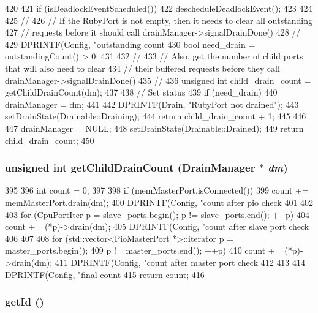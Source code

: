 \begin{DoxyCode}
420 {
421     if (isDeadlockEventScheduled()) {
422         descheduleDeadlockEvent();
423     }
424 
425     //
426     // If the RubyPort is not empty, then it needs to clear all outstanding
427     // requests before it should call drainManager->signalDrainDone()
428     //
429     DPRINTF(Config, "outstanding count %
430     bool need_drain = outstandingCount() > 0;
431 
432     //
433     // Also, get the number of child ports that will also need to clear
434     // their buffered requests before they call drainManager->signalDrainDone()
435     //
436     unsigned int child_drain_count = getChildDrainCount(dm);
437 
438     // Set status
439     if (need_drain) {
440         drainManager = dm;
441 
442         DPRINTF(Drain, "RubyPort not drained\n");
443         setDrainState(Drainable::Draining);
444         return child_drain_count + 1;
445     }
446 
447     drainManager = NULL;
448     setDrainState(Drainable::Drained);
449     return child_drain_count;
450 }
\end{DoxyCode}
\hypertarget{classRubyPort_a6497fe5e5b0476effb15db9118962e93}{
\subsubsection[{getChildDrainCount}]{\setlength{\rightskip}{0pt plus 5cm}unsigned int getChildDrainCount ({\bf DrainManager} $\ast$ {\em dm})}}
\label{classRubyPort_a6497fe5e5b0476effb15db9118962e93}



\begin{DoxyCode}
395 {
396     int count = 0;
397 
398     if (memMasterPort.isConnected()) {
399         count += memMasterPort.drain(dm);
400         DPRINTF(Config, "count after pio check %
401     }
402 
403     for (CpuPortIter p = slave_ports.begin(); p != slave_ports.end(); ++p) {
404         count += (*p)->drain(dm);
405         DPRINTF(Config, "count after slave port check %
406     }
407 
408     for (std::vector<PioMasterPort *>::iterator p = master_ports.begin();
409          p != master_ports.end(); ++p) {
410         count += (*p)->drain(dm);
411         DPRINTF(Config, "count after master port check %
412     }
413 
414     DPRINTF(Config, "final count %
415     return count;
416 }
\end{DoxyCode}
\hypertarget{classRubyPort_a0394d0753edf9da729ce700f110f650c}{
\subsubsection[{getId}]{ getId ()}}
\label{classRubyPort_a0394d0753edf9da729ce700f110f650c}



